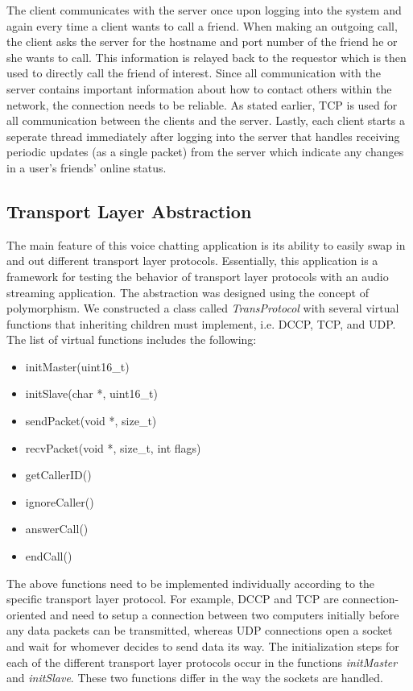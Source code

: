 The client communicates with the server once upon logging into the system and again
every time a client wants to call a friend.  When making an outgoing call,
the client asks the server for the hostname and port number of the friend he or
she wants to call.  This information is relayed back to the requestor which is then
used to directly call the friend of interest.  Since all communication with the
server contains important information about how to contact others within the 
network, the connection needs to be reliable. As stated earlier, TCP is used for all 
communication between the clients and the server. Lastly, each client starts a seperate thread
immediately after logging into the server that handles receiving
periodic updates (as a single packet) from the server which indicate any changes in a user's friends'
online status. 


\subsection{Transport Layer Abstraction}
\label{subsec:transport_abs}

The main feature of this voice chatting application is its ability to easily 
swap in and out different transport layer protocols.  Essentially, this application
is a framework for testing the behavior of transport layer protocols with an
audio streaming application.  The abstraction was designed using the concept of
polymorphism.  We constructed a class called \textit{TransProtocol} 
with several virtual functions that inheriting children must implement, i.e. DCCP,
TCP, and UDP.  The list of virtual functions includes the following:

\begin{itemize}
   \item{initMaster(uint16\_t)}
   \item{initSlave(char *, uint16\_t)}
   \item{sendPacket(void *, size\_t)}
   \item{recvPacket(void *, size\_t, int flags)}
   \item{getCallerID()}
   \item{ignoreCaller()}
   \item{answerCall()}
   \item{endCall()}
\end{itemize}

The above functions need to be implemented individually according to the specific
transport layer protocol.  For example, DCCP and TCP are connection-oriented and
need to setup a connection between two computers initially before any data packets 
can be transmitted, whereas UDP connections open a socket and wait for 
whomever decides to send data its way.  The initialization steps for each of the
different transport layer protocols occur in the functions \textit{initMaster} and
\textit{initSlave}.  These two functions differ in the way the sockets are handled.

